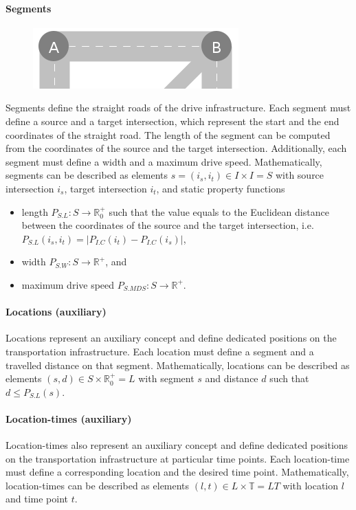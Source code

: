 \documentclass[graybox]{svmult}
\begin{document}
\paragraph{Segments}
\begin{figure}
	\begin{center}
		\includegraphics[scale=0.5]{../../concepts/segment.png}
	\end{center}
\end{figure}
Segments define the straight roads of the drive infrastructure.
Each segment must define a source and a target intersection, which represent the start and the end coordinates of the straight road.
The length of the segment can be computed from the coordinates of the source and the target intersection.
Additionally, each segment must define a width and a maximum drive speed.
Mathematically, segments can be described as elements $s = (i_s, i_t) \in I \times I = S$ with source intersection $i_s$, target intersection $i_t$, and static property functions
\begin{itemize}
	\item length $P_{S.L}: S \rightarrow \mathbb{R}_0^+$ such that the value equals to the Euclidean distance between the coordinates of the source and the target intersection, i.e.\ $P_{S.L}(i_s, i_t) = |P_{I.C}(i_t) - P_{I.C}(i_s)|$,
	\item width $P_{S.W}: S \rightarrow \mathbb{R}^+$, and
	\item maximum drive speed $P_{S.MDS}: S \rightarrow \mathbb{R}^+$.
\end{itemize}

\paragraph{Locations (auxiliary)}
Locations represent an auxiliary concept and define dedicated positions on the transportation infrastructure.
Each location must define a segment and a travelled distance on that segment.
Mathematically, locations can be described as elements $(s, d) \in S \times \mathbb{R}_0^+ = L$ with segment $s$ and distance $d$ such that $d \leq P_{S.L}(s)$.

\paragraph{Location-times (auxiliary)}
Location-times also represent an auxiliary concept and define dedicated positions on the transportation infrastructure at particular time points.
Each location-time must define a corresponding location and the desired time point.
Mathematically, location-times can be described as elements $(l, t) \in L \times \mathbb{T} = LT$ with location $l$ and time point $t$.
\end{document}
